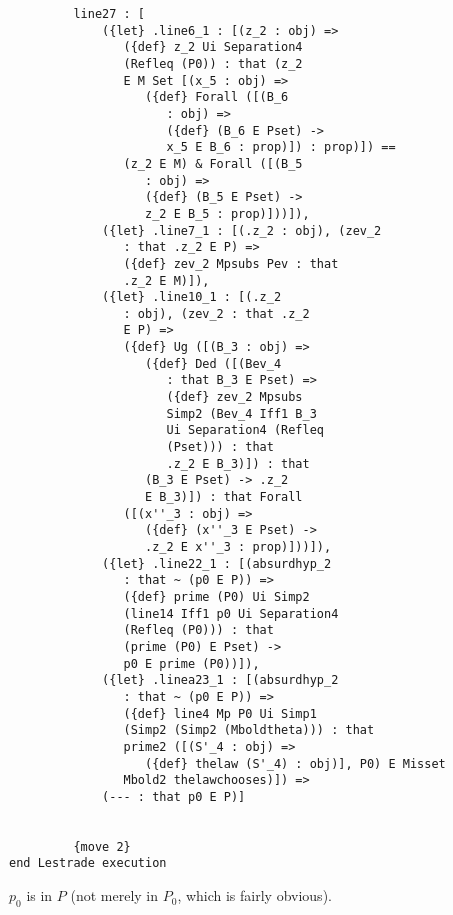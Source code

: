 \documentclass[12pt]{article}
\begin{document}
\begin{verbatim}
         line27 : [
             ({let} .line6_1 : [(z_2 : obj) => 
                ({def} z_2 Ui Separation4 
                (Refleq (P0)) : that (z_2 
                E M Set [(x_5 : obj) => 
                   ({def} Forall ([(B_6 
                      : obj) => 
                      ({def} (B_6 E Pset) -> 
                      x_5 E B_6 : prop)]) : prop)]) == 
                (z_2 E M) & Forall ([(B_5 
                   : obj) => 
                   ({def} (B_5 E Pset) -> 
                   z_2 E B_5 : prop)]))]), 
             ({let} .line7_1 : [(.z_2 : obj), (zev_2 
                : that .z_2 E P) => 
                ({def} zev_2 Mpsubs Pev : that 
                .z_2 E M)]), 
             ({let} .line10_1 : [(.z_2 
                : obj), (zev_2 : that .z_2 
                E P) => 
                ({def} Ug ([(B_3 : obj) => 
                   ({def} Ded ([(Bev_4 
                      : that B_3 E Pset) => 
                      ({def} zev_2 Mpsubs 
                      Simp2 (Bev_4 Iff1 B_3 
                      Ui Separation4 (Refleq 
                      (Pset))) : that 
                      .z_2 E B_3)]) : that 
                   (B_3 E Pset) -> .z_2 
                   E B_3)]) : that Forall 
                ([(x''_3 : obj) => 
                   ({def} (x''_3 E Pset) -> 
                   .z_2 E x''_3 : prop)]))]), 
             ({let} .line22_1 : [(absurdhyp_2 
                : that ~ (p0 E P)) => 
                ({def} prime (P0) Ui Simp2 
                (line14 Iff1 p0 Ui Separation4 
                (Refleq (P0))) : that 
                (prime (P0) E Pset) -> 
                p0 E prime (P0))]), 
             ({let} .linea23_1 : [(absurdhyp_2 
                : that ~ (p0 E P)) => 
                ({def} line4 Mp P0 Ui Simp1 
                (Simp2 (Simp2 (Mboldtheta))) : that 
                prime2 ([(S'_4 : obj) => 
                   ({def} thelaw (S'_4) : obj)], P0) E Misset 
                Mbold2 thelawchooses)]) => 
             (--- : that p0 E P)]


         {move 2}
end Lestrade execution
\end{verbatim}

$p_0$ is in $P$ (not merely in $P_0$, which is fairly obvious).
\end{document}
